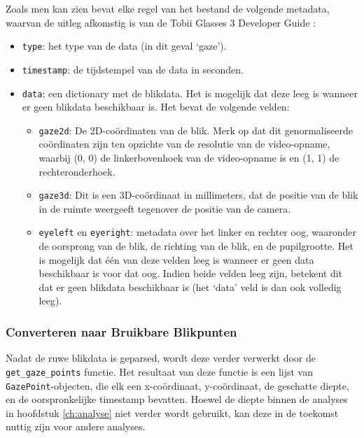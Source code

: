 Zoals men kan zien bevat elke regel van het bestand de volgende metadata, waarvan de uitleg afkomstig is van de Tobii Glasses 3 Developer Guide \autocite{tobii_developer_guide}:
\begin{itemize}
    \item \texttt{type}: het type van de data (in dit geval `gaze').
    \item \texttt{timestamp}: de tijdstempel van de data in seconden.
    \item \texttt{data}: een dictionary met de blikdata. Het is mogelijk dat deze leeg is wanneer er geen blikdata beschikbaar is. Het bevat de volgende velden:
    \begin{itemize}
      \item \texttt{gaze2d}: De 2D-coördinaten van de blik. Merk op dat dit genormaliseerde coördinaten zijn ten opzichte van de resolutie van de video-opname,
      waarbij (0, 0) de linkerbovenhoek van de video-opname is en (1, 1) de rechteronderhoek.
      \item \texttt{gaze3d}: Dit is een 3D-coördinaat in millimeters, dat de positie van de blik in de ruimte weergeeft tegenover de positie van de camera.
      \item \texttt{eyeleft} en \texttt{eyeright}: metadata over het linker en rechter oog, waaronder de oorsprong van de blik, de richting van de blik, en de pupilgrootte.
      Het is mogelijk dat één van deze velden leeg is wanneer er geen data beschikbaar is voor dat oog. Indien beide velden leeg zijn, betekent dit dat er geen blikdata beschikbaar is (het `data' veld is dan ook volledig leeg).
    \end{itemize}
\end{itemize}

\subsubsection{Converteren naar Bruikbare Blikpunten}

Nadat de ruwe blikdata is geparsed, wordt deze verder verwerkt door de \texttt{get\_gaze\_points} functie.
Het resultaat van deze functie is een lijst van \texttt{GazePoint}-objecten, die elk een x-coördinaat, y-coördinaat, 
de geschatte diepte, en de oorspronkelijke timestamp bevatten.
Hoewel de diepte binnen de analyses in hoofdstuk \ref{ch:analyse} niet verder wordt gebruikt, kan deze in de 
toekomst nuttig zijn voor andere analyses.

